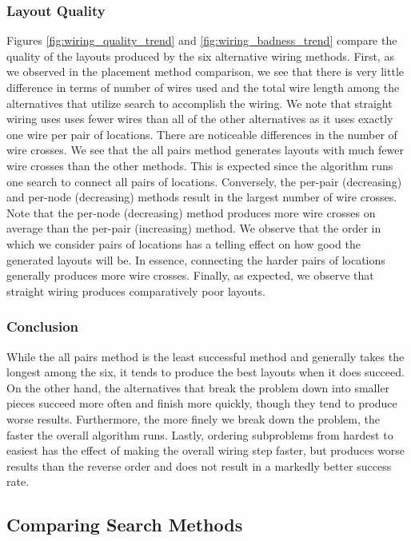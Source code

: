 \subsubsection{Layout Quality}
Figures \ref{fig:wiring_quality_trend} and
\ref{fig:wiring_badness_trend} compare the
quality of the layouts produced by the six alternative wiring methods. First,
as we observed in the placement method comparison, we see that there is very
little difference in terms of number of wires used and the total wire length
among the alternatives that utilize search to accomplish the wiring. We note
that straight wiring uses uses fewer wires than all of the other alternatives
as it uses exactly one wire per pair of locations.
There are noticeable differences in the number of wire crosses. We see
that the all pairs method generates layouts with much fewer wire crosses than
the other methods. This is expected since the algorithm runs one search to
connect all pairs of locations. Conversely, the per-pair (decreasing) and
per-node (decreasing) methods
result in the largest number of wire crosses. Note that
the per-node (decreasing) method produces more wire crosses on average than the
per-pair (increasing) method.
We observe that the order in which we consider pairs of
locations has a telling effect on how good the generated layouts will be.
In essence,
connecting the harder pairs of locations generally produces more wire crosses.
Finally, as expected, we observe that straight wiring produces comparatively
poor layouts.

\subsubsection{Conclusion}
While the all pairs method is the least successful
method and generally takes the longest among the six,
it tends to produce the best layouts when it does succeed. On the other hand,
the alternatives that break the problem down into smaller pieces succeed more
often and finish more quickly, though they tend to produce worse results.
Furthermore,
the more finely we break down the problem, the faster the overall algorithm runs.
Lastly, ordering subproblems from hardest to easiest has the effect of making the
overall wiring step faster, but produces worse results than the reverse
order and does not result in a markedly better success rate.

\subsection{Comparing Search Methods}

